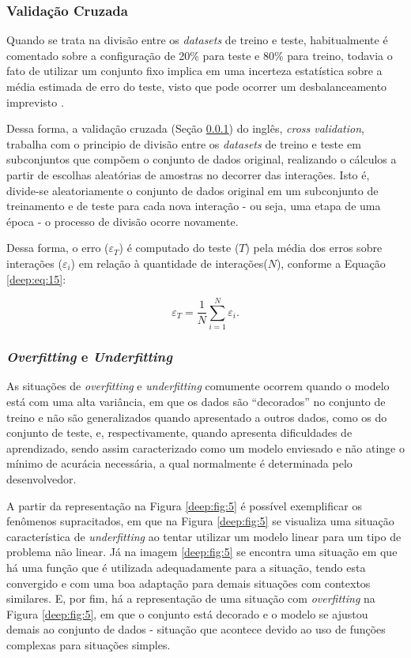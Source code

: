 \subsubsection{Validação Cruzada}
\label{deep:cross}

Quando se trata na divisão entre os \textit{datasets} de treino e teste, habitualmente é comentado sobre a configuração de 20\% para teste e 80\% para treino, todavia o fato de utilizar um conjunto fixo implica em uma incerteza estatística sobre a média estimada de erro do teste, visto que pode ocorrer um desbalanceamento imprevisto \cite{Goodfellow2016}.

Dessa forma, a validação cruzada (Seção \ref{deep:cross}) do inglês, \textit{cross validation}, trabalha com o principio de divisão entre os \textit{datasets} de treino e teste em subconjuntos que compõem o conjunto de dados original, realizando o cálculos a partir de escolhas aleatórias de amostras no decorrer das interações. Isto é, divide-se aleatoriamente o conjunto de dados original em um subconjunto de treinamento e de teste para cada nova interação - ou seja, uma etapa de uma época - o processo de divisão ocorre novamente.

Dessa forma, o erro ($\varepsilon_T$) é computado do teste ($T$) pela média dos erros sobre interações ($\varepsilon_i$) em relação à quantidade de interações($N$), conforme a Equação \ref{deep:eq:15}:

\begin{equation}
    \label{deep:eq:15}
    \varepsilon_T = \frac{1}{N} \sum_{i=1}^{N} \varepsilon_i.
\end{equation}


\subsubsection{\textit{Overfitting} e \textit{Underfitting}}
\label{deep:overunder}

As situações de \textit{overfitting} e \textit{underfitting} comumente ocorrem quando o modelo está com uma alta variância, em que os dados são ``decorados'' no conjunto de treino e não são generalizados quando apresentado a outros dados, como os do conjunto de teste, e, respectivamente, quando apresenta dificuldades de aprendizado, sendo assim caracterizado como um modelo enviesado e não atinge o mínimo de acurácia necessária, a qual normalmente é determinada pelo desenvolvedor.

A partir da representação na Figura \ref{deep:fig:5} é possível exemplificar os fenômenos supracitados, em que na Figura \ref{deep:fig:5} se visualiza uma situação característica de \textit{underfitting} ao tentar utilizar um modelo linear para um tipo de problema não linear. Já na imagem \ref{deep:fig:5} se encontra uma situação em que há uma função que é utilizada adequadamente para a situação, tendo esta convergido e com uma boa adaptação para demais situações com contextos similares. E, por fim, há a representação de uma situação com \textit{overfitting} na Figura \ref{deep:fig:5}, em que o conjunto está decorado e o modelo se ajustou demais ao conjunto de dados - situação que acontece devido ao uso de funções complexas para situações simples.

